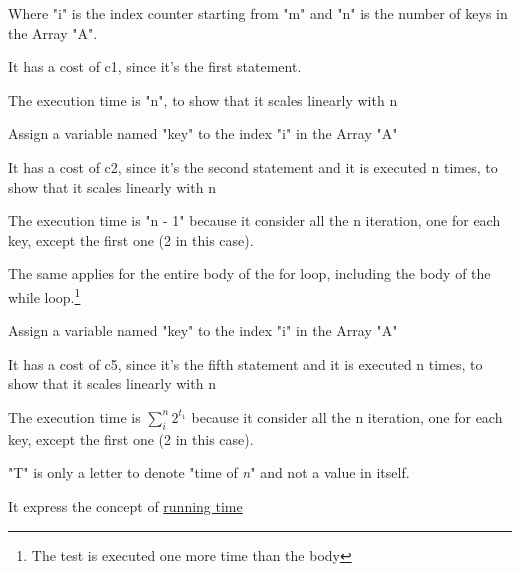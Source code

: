 \begin{eg}[for i = m to n]
    Where "i" is the index counter starting from "m" and "n" is the number of keys in the Array "A".   
    
    It has a cost of c1, since it's the first statement.
    
    The execution time is "n", to show that it scales linearly with n
\end{eg}


\begin{eg}[key = A{[1]}]
    Assign a variable named "key" to the index "i" in the Array "A"
    
    It has a cost of c2, since it's the second statement and it is executed n times, to show that it scales linearly with n

    The execution time is "n - 1" because it consider all the n iteration, one for each key, except the first one (2 in this case).

    \begin{remark}[n - 1]
        The same applies for the entire body of the for loop, including the body of the while loop.\footnote{The test is executed one more time than the body}
    \end{remark}
\end{eg}


\begin{eg}
    Assign a variable named "key" to the index "i" in the Array "A"
    
    It has a cost of c5, since it's the fifth statement and it is executed n times, to show that it scales linearly with n

    The execution time is $\sum_{i}^{n}2^{t_1}$ because it consider all the n iteration, one for each key, except the first one (2 in this case).

    \begin{remark}[T(n)]
        "T" is only a letter to denote "time of \emph{n}" and not a value in itself.

        It express the concept of \hyperref[def:running_time_1]{running time}
    \end{remark}
\end{eg}